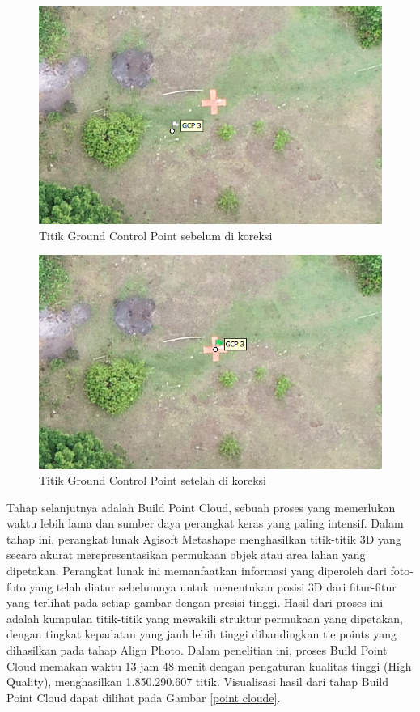 \begin{figure}[H]
    \centering
    \includegraphics[width = 11.5cm]{image/gcp tidak akurat.png}
    \caption{Titik Ground Control Point sebelum di koreksi}
    \label{gcptidakakurat}
\end{figure}

\begin{figure}[H]
    \centering
    \includegraphics[width = 11.5cm]{image/gcp akurat.png}
    \caption{Titik Ground Control Point setelah di koreksi}
    \label{gcpakurat}
\end{figure}


Tahap selanjutnya adalah Build Point Cloud, sebuah proses yang memerlukan waktu lebih lama dan sumber daya perangkat keras yang paling intensif. Dalam tahap ini, perangkat lunak Agisoft Metashape menghasilkan titik-titik 3D yang secara akurat merepresentasikan permukaan objek atau area lahan yang dipetakan. Perangkat lunak ini memanfaatkan informasi yang diperoleh dari foto-foto yang telah diatur sebelumnya untuk menentukan posisi 3D dari fitur-fitur yang terlihat pada setiap gambar dengan presisi tinggi. Hasil dari proses ini adalah kumpulan titik-titik yang mewakili struktur permukaan yang dipetakan, dengan tingkat kepadatan yang jauh lebih tinggi dibandingkan tie points yang dihasilkan pada tahap Align Photo. Dalam penelitian ini, proses Build Point Cloud memakan waktu 13 jam 48 menit dengan pengaturan kualitas tinggi (High Quality), menghasilkan 1.850.290.607 titik. Visualisasi hasil dari tahap Build Point Cloud dapat dilihat pada Gambar \ref{point cloude}.

